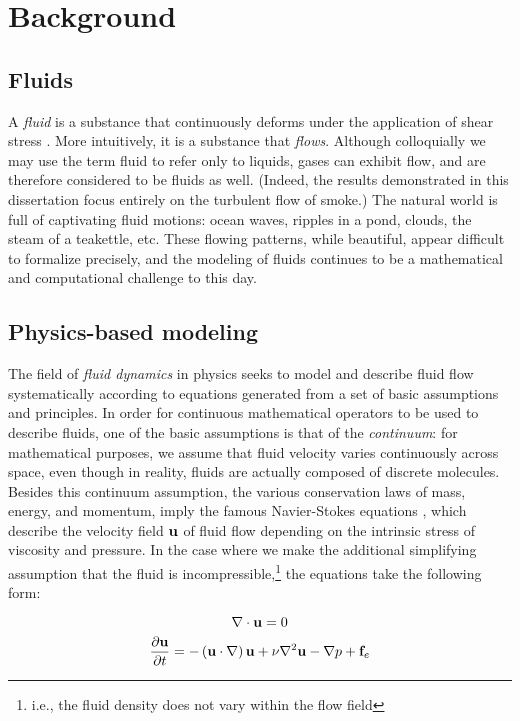 \chapter[Background]{Background}
\label{chap:chap3}
\section{Fluids}

A {\em fluid} is a substance that continuously deforms under the application of shear stress \cite{batchelor2000introduction}. More intuitively, it is a substance that {\em flows}. Although colloquially we may use the term fluid to refer only to liquids, gases can exhibit flow, and are therefore considered to be fluids as well. (Indeed, the results demonstrated in this dissertation focus entirely on the turbulent flow of smoke.) The natural world is full of captivating fluid motions: ocean waves, ripples in a pond, clouds, the steam of a teakettle, etc. These flowing patterns, while beautiful, appear difficult to formalize precisely, and the modeling of fluids continues to be a mathematical and computational challenge to this day.

\section{Physics-based modeling}
The field of {\em fluid dynamics} in physics seeks to model and describe fluid flow systematically according to equations generated from a set of basic assumptions and principles. In order for continuous mathematical operators to be used to describe fluids, one of the basic assumptions is that of the {\em continuum}: for mathematical purposes, we assume that fluid velocity varies continuously across space, even though in reality, fluids are actually composed of discrete molecules. Besides this continuum assumption, the various conservation laws of mass, energy, and momentum, imply the famous Navier-Stokes equations \cite{currie2012fundamental}, which describe the velocity field $\mathbf{u}$ of fluid flow depending on the intrinsic stress of viscosity and pressure. In the case where we make the additional simplifying assumption that the fluid is incompressible,\footnote{i.e., the fluid density does not vary within the flow field} the equations take the following form:

\begin{equation}
\label{eq:incompress}
\nabla \cdot \mathbf{u} = 0
\end{equation}
\begin{equation}
\label{eq:momentum}
\frac{\partial \mathbf{u}}{\partial t} = -\left(\mathbf{u} \cdot \nabla \right)\mathbf{u} + \nu \nabla^{2}\mathbf{u} - \nabla{p} + \mathbf{f}_e
\end{equation}

